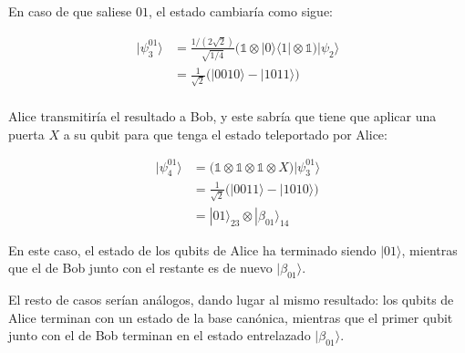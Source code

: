 \documentclass{article}
\begin{document}
En caso de que saliese $01$, el estado cambiaría como sigue:

\begin{align*}
  |\psi_3^{01}\rangle 
        &= \frac{1/(2\sqrt{2})}{\sqrt{1/4}}\Big(
          \mathbb{1}
          \otimes |0 \rangle\langle 1|
          \otimes \mathbb{1}
          \Big)|\psi_2\rangle \\ 
        &= \frac{1}{\sqrt{2}}\Big(
          |0010\rangle 
          - |1011\rangle 
        \Big) \\ 
\end{align*}

Alice transmitiría el resultado a Bob, y este sabría que tiene que
aplicar una puerta $X$ a su qubit para que tenga el estado
teleportado por Alice:

\begin{align*}
  |\psi_4^{01}\rangle 
        &= \Big(
          \mathbb{1}
          \otimes \mathbb{1}
          \otimes \mathbb{1}
          \otimes X
          \Big)|\psi_3^{01}\rangle \\ 
        &= \frac{1}{\sqrt{2}}\Big(
          |0011\rangle 
          - |1010\rangle 
        \Big) \\
        &= |01\rangle_{23}\otimes|\beta_{01}\rangle_{14}
\end{align*}

En este caso, el estado de los qubits de Alice ha terminado siendo
$|01\rangle$, mientras que el de Bob junto con el restante es de nuevo
$|\beta_{01}\rangle$.

El resto de casos serían análogos, dando lugar al mismo resultado:
los qubits de Alice terminan con un estado de la base canónica,
mientras que el primer qubit junto con el de Bob terminan en el
estado entrelazado $|\beta_{01}\rangle$.
\end{document}
